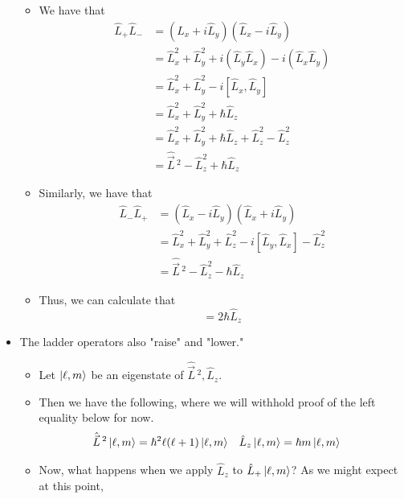 \documentclass[../notes.tex]{subfiles}
\begin{document}
\begin{itemize}
    \begin{itemize}
        \item We have that
        \begin{align*}
            \hat{L}_+\hat{L}_- &= (\hat{L}_x+i\hat{L}_y)(\hat{L}_x-i\hat{L}_y)\\
            &= \hat{L}_x^2+\hat{L}_y^2+i(\hat{L}_y\hat{L}_x)-i(\hat{L}_x\hat{L}_y)\\
            &= \hat{L}_x^2+\hat{L}_y^2-i[\hat{L}_x,\hat{L}_y]\\
            &= \hat{L}_x^2+\hat{L}_y^2+\hbar\hat{L}_z\\
            &= \hat{L}_x^2+\hat{L}_y^2+\hbar\hat{L}_z+\hat{L}_z^2-\hat{L}_z^2\\
            &= \hat{\vec{L}}{\,}^2-\hat{L}_z^2+\hbar\hat{L}_z
        \end{align*}
        \item Similarly, we have that
        \begin{align*}
            \hat{L}_-\hat{L}_+ &= (\hat{L}_x-i\hat{L}_y)(\hat{L}_x+i\hat{L}_y)\\
            &= \hat{L}_x^2+\hat{L}_y^2+\hat{L}_z^2-i[\hat{L}_y,\hat{L}_x]-\hat{L}_z^2\\
            &= \hat{\vec{L}}{\,}^2-\hat{L}_z^2-\hbar\hat{L}_z
        \end{align*}
        \item Thus, we can calculate that
        \begin{equation*}
            [\hat{L}_+,\hat{L}_-] = 2\hbar\hat{L}_z
        \end{equation*}
    \end{itemize}
    \item The ladder operators also "raise" and "lower."
    \begin{itemize}
        \item Let $\ket{\ell,m}$ be an eigenstate of $\hat{\vec{L}}{\,}^2,\hat{L}_z$.
        \item Then we have the following, where we will withhold proof of the left equality below for now.
        \begin{align*}
            \hat{\vec{L}}{\,}^2\ket{\ell,m} &= \hbar^2\ell(\ell+1)\ket{\ell,m}&
            \hat{L}_z\ket{\ell,m} &= \hbar m\ket{\ell,m}
        \end{align*}
        \item Now, what happens when we apply $\hat{L}_z$ to $\hat{L}_+\ket{\ell,m}$? As we might expect at this point,
        \begin{align*}

\end{align*}
\end{itemize}
\end{itemize}
\end{document}
